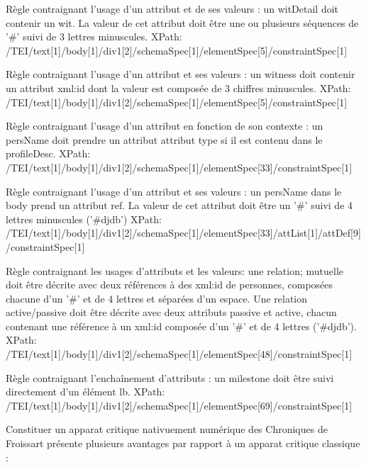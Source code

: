 \documentclass[12pt, a4paper]{article}
\begin{document}
                        Règle contraignant l'usage d'un attribut et de ses valeurs : un witDetail doit contenir un wit. 
                           La valeur de cet attribut doit être une ou plusieurs séquences de '#' suivi de 3 lettres minuscules.
                           XPath: /TEI/text[1]/body[1]/div1[2]/schemaSpec[1]/elementSpec[5]/constraintSpec[1]
                        
                        Règle contraignant l'usage d'un attribut et ses valeurs : un witness doit contenir un attribut xml:id
                           dont la valeur est composée de 3 chiffres minuscules.
                           XPath: /TEI/text[1]/body[1]/div1[2]/schemaSpec[1]/elementSpec[5]/constraintSpec[1]
                        
                        Règle contraignant l'usage d'un attribut en fonction de son contexte : un persName doit prendre un attribut attribut type
                           si il est contenu dans le profileDesc.
                           XPath: /TEI/text[1]/body[1]/div1[2]/schemaSpec[1]/elementSpec[33]/constraintSpec[1]
                        
                        Règle contraignant l'usage d'un attribut et ses valeurs : un persName dans le body prend un attribut ref.
                           La valeur de cet attribut doit être un '#' suivi de 4 lettres minuscules ('#djdb')
                           XPath: /TEI/text[1]/body[1]/div1[2]/schemaSpec[1]/elementSpec[33]/attList[1]/attDef[9]/constraintSpec[1]
                        
                        Règle contraignant les usages d'attributs et les valeurs: une relation; mutuelle doit être décrite avec deux références à des xml:id de personnes,
                           composées chacune d'un '#' et de 4 lettres et séparées d'un espace. Une relation active/passive doit être décrite avec
                           deux attributs passive et active, chacun contenant une référence à un xml:id composée d'un '#' et de 4 lettres ('#djdb').
                           XPath: /TEI/text[1]/body[1]/div1[2]/schemaSpec[1]/elementSpec[48]/constraintSpec[1]
                        
                        Règle contraignant l'enchaînement d'attributs : un milestone doit être suivi directement d'un élément lb.
                           XPath: /TEI/text[1]/body[1]/div1[2]/schemaSpec[1]/elementSpec[69]/constraintSpec[1]
                        
                     
                  Constituer un apparat critique nativuement numérique des Chroniques de  Froissart  présente plusieurs avantages par rapport à un apparat critique classique :
                  
\end{document}
